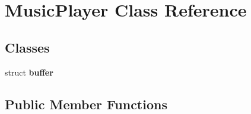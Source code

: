 \hypertarget{classMusicPlayer}{\section{\-Music\-Player \-Class \-Reference}
\label{classMusicPlayer}
}
\subsection*{\-Classes}
\begin{DoxyCompactItemize}
\item 
struct {\bfseries buffer}
\end{DoxyCompactItemize}
\subsection*{\-Public \-Member \-Functions}
